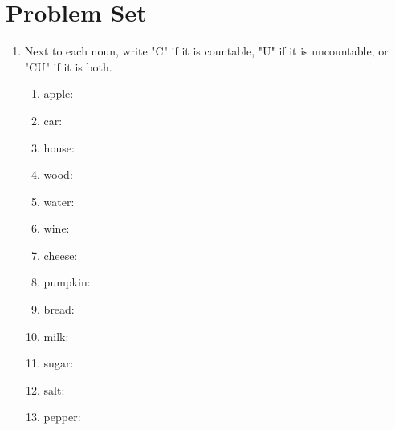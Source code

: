 \documentclass{tufte-book}
\begin{document}
\clearpage\section{Problem Set }

\begin{enumerate}
  \item {}
  Next to each noun, write "C" if it is countable, "U" if it is uncountable, or "CU" if it is both.
  \begin{multicols}{3}
  \begin{enumerate}
    \item apple: \dotfill
    \item car: \dotfill
    \item house: \dotfill
    \item wood: \dotfill
    \item water: \dotfill
    \item wine: \dotfill
    \item cheese: \dotfill
    \item pumpkin: \dotfill
    \item bread: \dotfill
    \item milk: \dotfill
    \item sugar: \dotfill
    \item salt: \dotfill
    \item pepper: \dotfill
  \end{enumerate}
  \end{multicols}


\end{enumerate}
\end{document}
